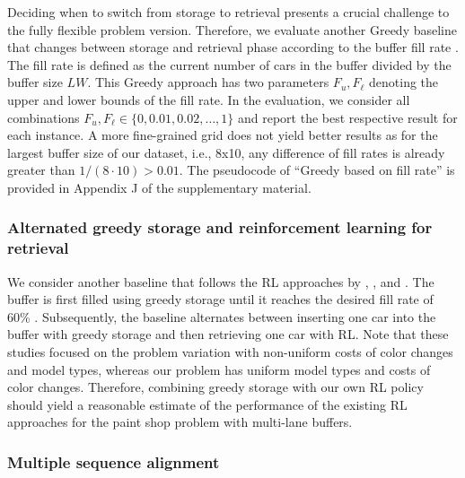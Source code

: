 \documentclass[11pt]{elsarticle}
\newcommand{\blackversion}{ }
\newcommand{\blackorcolor}{
\ifdefined\blackversion
	\color{black}
\fi
}
\newcommand{\REV}[1]{{\color{myblue}\blackorcolor #1}}
\begin{document}
 

Deciding when to switch from storage to retrieval presents a crucial challenge to the fully flexible problem version. Therefore, we evaluate another Greedy baseline that changes between storage and retrieval phase according to the buffer fill rate \citep[e.g.,][]{Huang.2024,sun2017study}. The fill rate is defined as the current number of cars in the buffer divided by the buffer size $LW$.
\REV{This Greedy approach has two parameters $F_u, F_\ell$ denoting the upper and lower bounds of the fill rate. In the evaluation, we consider all combinations $F_u, F_\ell \in \{0,0.01,0.02,\dots, 1\}$ and report the best respective result for each instance.}
A more fine-grained grid does not yield better results as for the largest buffer size of our dataset, i.e., 8x10, any difference of fill rates is already greater than $1/(8\cdot 10)>0.01$. The pseudocode of ``Greedy based on fill rate'' is provided in Appendix J of the supplementary material.



\subsubsection*{Alternated greedy storage and reinforcement learning for retrieval}

We consider another baseline that follows the RL approaches by \citet{Leng.2020}, \citet{Leng.2023}, and \citet{Huang.2024}. The buffer is first filled using greedy storage until it reaches the desired fill rate of 60\% \citep{Huang.2024,sun2017study}. Subsequently, the baseline alternates between inserting one car into the buffer with greedy storage and then retrieving one car with RL. Note that these studies focused on the problem variation with non-uniform costs of color changes and model types, whereas our problem has uniform model types and costs of color changes. Therefore, combining greedy storage with our own RL policy should yield a reasonable estimate of the performance of the existing RL approaches for the paint shop problem with multi-lane buffers.


\subsubsection*{Multiple sequence alignment}
\end{document}
